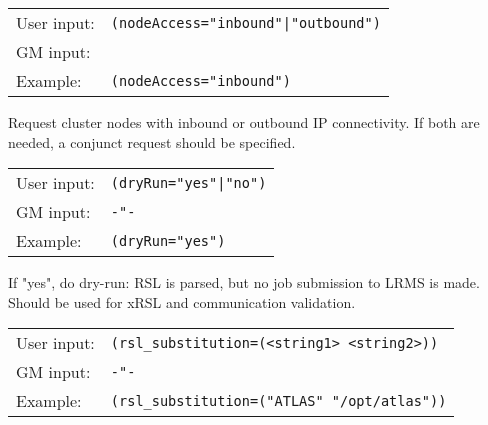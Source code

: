   \hspace*{0.5cm}
  \begin{shaded}
  \end{shaded}
  \begin{tabular}{lp{13cm}}
    User input:&\verb#(nodeAccess="inbound"|"outbound")#\\
    GM input:&\\
    Example:&\verb#(nodeAccess="inbound")#\\
  \end{tabular}

  Request cluster nodes with inbound or outbound IP connectivity. If
  both are needed, a conjunct request should be specified.

  \hspace*{0.5cm}
  \begin{shaded}
  \end{shaded}
  \begin{tabular}{lp{13cm}}
    User input:&\verb#(dryRun="yes"|"no")#\\
    GM input:&\verb#-"-#\\
    Example:&\verb#(dryRun="yes")#\\
  \end{tabular}

  If "yes", do dry-run: RSL is parsed, but no job submission to LRMS
  is made. Should be used for xRSL and communication validation.

  \hspace*{0.5cm}
  \begin{shaded}
  \end{shaded}
  \begin{tabular}{lp{13cm}}
    User input:&\verb#(rsl_substitution=(<string1> <string2>))#\\
    GM input:&\verb#-"-#\\
    Example:&\verb#(rsl_substitution=("ATLAS" "/opt/atlas"))#\\
  \end{tabular}

